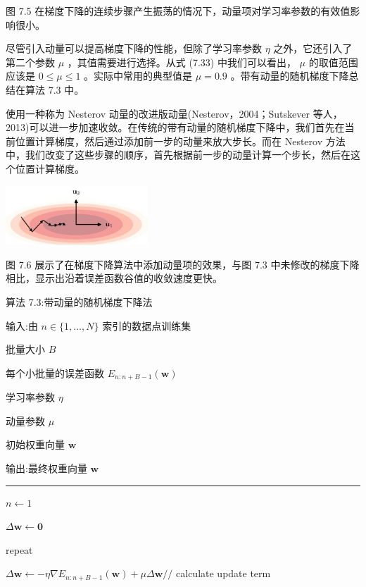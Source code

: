 \documentclass[10pt]{article}
\newcommand{\HRule}{\begin{center}\rule{0.9\linewidth}{0.2mm}\end{center}}
\begin{document}
图 7.5 在梯度下降的连续步骤产生振荡的情况下，动量项对学习率参数的有效值影响很小。

尽管引入动量可以提高梯度下降的性能，但除了学习率参数 \(\eta\) 之外，它还引入了第二个参数 \(\mu\) ，其值需要进行选择。从式 (7.33) 中我们可以看出， \(\mu\) 的取值范围应该是 \(0 \leq  \mu  \leq  1\) 。实际中常用的典型值是 \(\mu  = {0.9}\) 。带有动量的随机梯度下降总结在算法 7.3 中。

使用一种称为 Nesterov 动量的改进版动量(Nesterov，2004；Sutskever 等人，2013)可以进一步加速收敛。在传统的带有动量的随机梯度下降中，我们首先在当前位置计算梯度，然后通过添加前一步的动量来放大步长。而在 Nesterov 方法中，我们改变了这些步骤的顺序，首先根据前一步的动量计算一个步长，然后在这个位置计算梯度。

\begin{center}
\includegraphics[max width=0.4\textwidth]{images/0194e279-9b28-703a-88f4-c3ac21e2010d_240_970_1646_569_236_0.jpg}
\end{center}
\hspace*{3em} 

图 7.6 展示了在梯度下降算法中添加动量项的效果，与图 7.3 中未修改的梯度下降相比，显示出沿着误差函数谷值的收敛速度更快。

算法 7.3:带动量的随机梯度下降法

输入:由 \(n \in  \{ 1,\ldots ,N\}\) 索引的数据点训练集

批量大小 \(B\)

每个小批量的误差函数 \({E}_{n : n + B - 1}\left( \mathbf{w}\right)\)

学习率参数 \(\eta\)

动量参数 \(\mu\)

初始权重向量 \(\mathbf{w}\)

输出:最终权重向量 \(\mathbf{w}\)

\HRule

\(n \leftarrow  1\)

\(\Delta \mathbf{w} \leftarrow  \mathbf{0}\)

repeat

\hspace*{1em} \(\Delta \mathbf{w} \leftarrow   - \eta \nabla {E}_{n : n + B - 1}\left( \mathbf{w}\right)  + {\mu \Delta }\mathbf{w}//\) calculate update term
\end{document}
